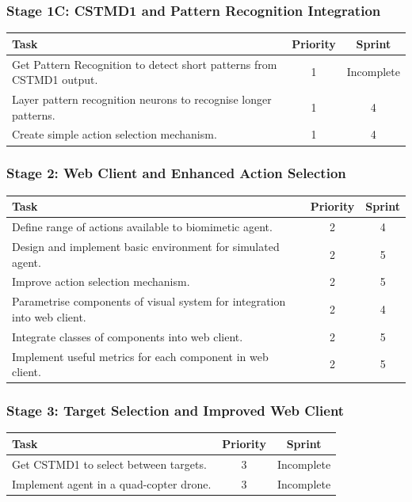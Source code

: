 \documentclass[a4paper,11pt]{article}
\begin{document}
\subsubsection{Stage 1C: CSTMD1 and Pattern Recognition Integration}
\begin{center}
    \begin{tabular}{p{12cm} c c}
    \textbf{Task} & \textbf{Priority} & \textbf{Sprint} \\ \hline
	Get Pattern Recognition to detect short patterns from CSTMD1 output. & 1 & Incomplete \\
	Layer pattern recognition neurons to recognise longer patterns. & 1 & 4\\
	Create simple action selection mechanism. & 1 & 4 \\
    \end{tabular}
\end{center}

\subsubsection{Stage 2: Web Client and Enhanced Action Selection}
\begin{center}
    \begin{tabular}{p{12cm} c c}
    \textbf{Task} & \textbf{Priority} & \textbf{Sprint} \\ \hline
    Define range of actions available to biomimetic agent. & 2 & 4 \\
    Design and implement basic environment for simulated agent. & 2 & 5 \\
    Improve action selection mechanism. & 2 & 5 \\
	Parametrise components of visual system for integration into web client. & 2 & 4 \\
	Integrate classes of components into web client. & 2 & 5 \\	
	Implement useful metrics for each component in web client. & 2 & 5 \\
    \end{tabular}
\end{center}

\subsubsection{Stage 3: Target Selection and Improved Web Client}
\begin{center}
    \begin{tabular}{p{12cm} c c}
    \textbf{Task} & \textbf{Priority} & \textbf{Sprint} \\ \hline
    Get CSTMD1 to select between targets. & 3 & Incomplete \\
    Implement agent in a quad-copter drone. & 3 & Incomplete \\
    \end{tabular}
\end{center}
\end{document}
